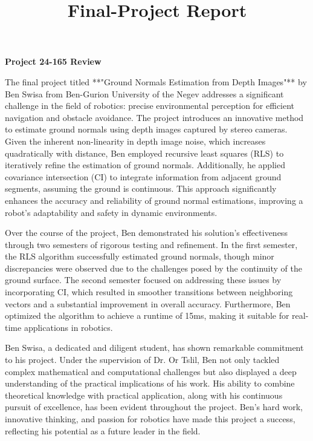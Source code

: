 \documentclass[12pt,a4paper,oneside,onecolumn]{book}
\title{Final-Project Report}
\begin{document}

% 
% 

\frontmatter
% 
% 

% 

\Large \textbf{Project 24-165 Review} 
\normalsize

The final project titled **"Ground Normals Estimation from Depth Images"** by Ben Swisa from Ben-Gurion University of the Negev addresses a significant challenge in the field of robotics: precise environmental perception for efficient navigation and obstacle avoidance. The project introduces an innovative method to estimate ground normals using depth images captured by stereo cameras. Given the inherent non-linearity in depth image noise, which increases quadratically with distance, Ben employed recursive least squares (RLS) to iteratively refine the estimation of ground normals. Additionally, he applied covariance intersection (CI) to integrate information from adjacent ground segments, assuming the ground is continuous. This approach significantly enhances the accuracy and reliability of ground normal estimations, improving a robot's adaptability and safety in dynamic environments.

Over the course of the project, Ben demonstrated his solution's effectiveness through two semesters of rigorous testing and refinement. In the first semester, the RLS algorithm successfully estimated ground normals, though minor discrepancies were observed due to the challenges posed by the continuity of the ground surface. The second semester focused on addressing these issues by incorporating CI, which resulted in smoother transitions between neighboring vectors and a substantial improvement in overall accuracy. Furthermore, Ben optimized the algorithm to achieve a runtime of 15ms, making it suitable for real-time applications in robotics.

Ben Swisa, a dedicated and diligent student, has shown remarkable commitment to his project. Under the supervision of Dr. Or Tslil, Ben not only tackled complex mathematical and computational challenges but also displayed a deep understanding of the practical implications of his work. His ability to combine theoretical knowledge with practical application, along with his continuous pursuit of excellence, has been evident throughout the project. Ben's hard work, innovative thinking, and passion for robotics have made this project a success, reflecting his potential as a future leader in the field.
\end{document}
